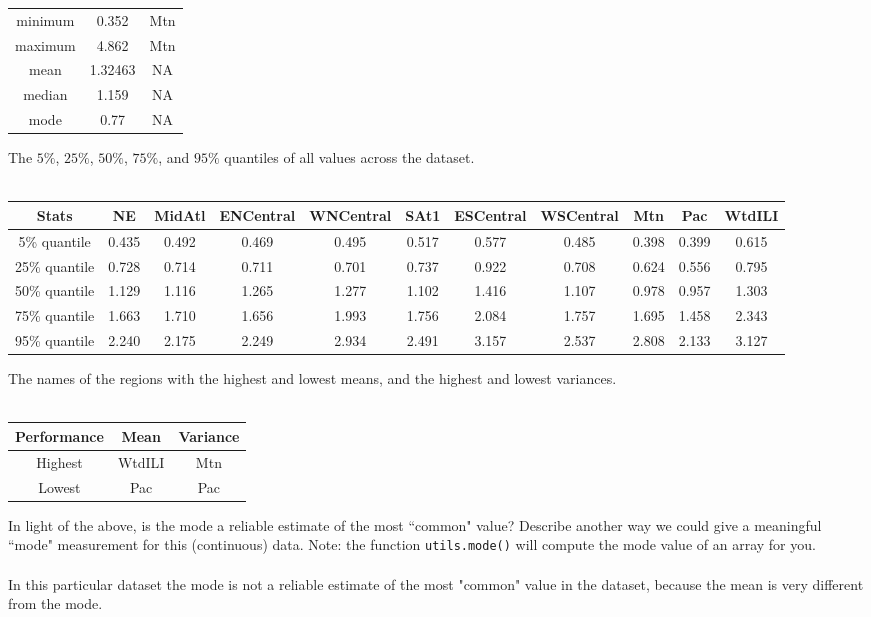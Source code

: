 \documentclass{article}
\def\blu#1{{\color{blu}#1}}
\def\ans#1{{\color{ans}#1}}
\begin{document}
{{\begin{tabular}{SSS}
        {minimum} & 0.352 & {Mtn} \\
        {maximum} & 4.862 & {Mtn} \\
        {mean} & 1.32463 & {NA} \\
        {median} & 1.159 & {NA} \\
        {mode} & 0.77 & {NA} \\ \bottomrule
    \end{tabular}
    \normalsize
}
\setlength{\tabcolsep}{6pt}
\item The $5\%$, $25\%$, $50\%$, $75\%$, and $95\%$ quantiles of all values across the dataset. \\ \\
\ans{
    \scriptsize
    \setlength{\tabcolsep}{2pt}
    \begin{tabular}{SSSSSSSSSSS} \toprule
        {Stats} & {NE} & {MidAtl} & {ENCentral} & {WNCentral} & {SAt1} & {ESCentral} & {WSCentral} & {Mtn} & {Pac} & {WtdILI} \\ \midrule
        {5\% quantile} & 0.435 & 0.492 & 0.469 & 0.495 & 0.517 & 0.577 & 0.485 & 0.398 & 0.399 & 0.615 \\
        {25\% quantile} & 0.728 & 0.714 & 0.711 & 0.701 & 0.737 & 0.922 & 0.708 & 0.624 & 0.556 & 0.795 \\
        {50\% quantile} & 1.129 & 1.116 & 1.265 & 1.277 & 1.102 & 1.416 & 1.107 & 0.978 & 0.957 & 1.303 \\
        {75\% quantile} & 1.663 & 1.710 & 1.656 & 1.993 & 1.756 & 2.084 & 1.757 & 1.695 & 1.458 & 2.343 \\
        {95\% quantile} & 2.240 & 2.175 & 2.249 & 2.934 & 2.491 & 3.157 & 2.537 & 2.808 & 2.133 & 3.127 \\ \bottomrule
    \end{tabular}
    \normalsize
}
\setlength{\tabcolsep}{6pt}
\item The names of the regions with the highest and lowest means, and the highest and lowest variances. \\ \\
\ans{
    \scriptsize
    \setlength{\tabcolsep}{2pt}
    \begin{tabular}{SSS} \toprule
        {Performance} & {Mean} & {Variance} \\ \midrule
        {Highest} & {WtdILI} & {Mtn} \\
        {Lowest} & {Pac} & {Pac} \\ \bottomrule
    \end{tabular}
    \normalsize
}
\setlength{\tabcolsep}{6pt}
}
In light of the above, \blu{is the mode a reliable estimate of the most ``common" value? Describe another way we could give a meaningful ``mode" measurement for this (continuous) data.} Note: the function \texttt{utils.mode()} will compute the mode value of an array for you. \\ \\
\ans{
    In this particular dataset the mode is not a reliable estimate of the most "common" value in the dataset, because the mean is very different from the mode.
}
\end{document}

